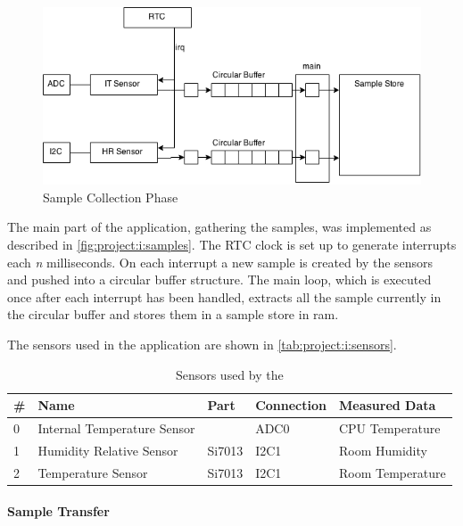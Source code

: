 \begin{figure}[H]
  \begin{center}
    \includegraphics[scale=0.5]{figures/project-i.png}
  \end{center}
  \caption{Sample Collection Phase}
  \label{fig:project:i:samples}
\end{figure}
The main part of the application, gathering the samples, was implemented as described in \autoref{fig:project:i:samples}.
The RTC clock is set up to generate interrupts each \emph{n} milliseconds.
On each interrupt a new sample is created by the sensors and pushed into a circular buffer structure.
The main loop, which is executed once after each interrupt has been handled, extracts all the sample currently in the circular buffer and stores them in a sample store in \gls{ram}.

The sensors used in the application are shown in \autoref{tab:project:i:sensors}.

\begin{table}[H]
  \centering
  \begin{tabular}{ l | l | l | l | l }
    \textbf{\#} & \textbf{Name} & \textbf{Part} & \textbf{Connection} & \textbf{Measured Data} \\
    \hline
    0 & Internal Temperature Sensor & & ADC0 & CPU Temperature \\
    1 & Humidity Relative Sensor & Si7013 & I2C1 & Room Humidity \\
    2 & Temperature Sensor & Si7013 & I2C1 & Room Temperature \\
    \hline
  \end{tabular}
  \caption{Sensors used by the {\tracker}}
  \label{tab:project:i:sensors}
\end{table}

\paragraph{Sample Transfer}

